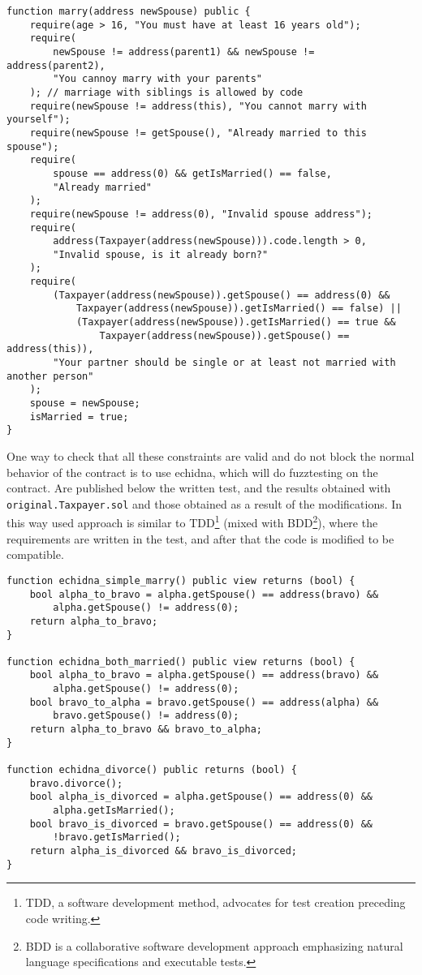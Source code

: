 \documentclass{article}
\begin{document}
\begin{verbatim}
function marry(address newSpouse) public {
    require(age > 16, "You must have at least 16 years old");
    require(
        newSpouse != address(parent1) && newSpouse != address(parent2),
        "You cannoy marry with your parents"
    ); // marriage with siblings is allowed by code
    require(newSpouse != address(this), "You cannot marry with yourself");
    require(newSpouse != getSpouse(), "Already married to this spouse");
    require(
        spouse == address(0) && getIsMarried() == false,
        "Already married"
    );
    require(newSpouse != address(0), "Invalid spouse address");
    require(
        address(Taxpayer(address(newSpouse))).code.length > 0,
        "Invalid spouse, is it already born?"
    );
    require(
        (Taxpayer(address(newSpouse)).getSpouse() == address(0) &&
            Taxpayer(address(newSpouse)).getIsMarried() == false) ||
            (Taxpayer(address(newSpouse)).getIsMarried() == true &&
                Taxpayer(address(newSpouse)).getSpouse() == address(this)),
        "Your partner should be single or at least not married with another person"
    );
    spouse = newSpouse;
    isMarried = true;
}
\end{verbatim}
One way to check that all these constraints are valid and do not block the normal behavior of the contract is to use echidna, which will do fuzztesting on the contract. Are published below the written test, and the results obtained with \texttt{original.Taxpayer.sol} and those obtained as a result of the modifications. In this way used approach is similar to TDD\footnote{TDD, a software development method, advocates for test creation preceding code writing.} (mixed with BDD\footnote{BDD is a collaborative software development approach emphasizing natural language specifications and executable tests.}), where the requirements are written in the test, and after that the code is modified to be compatible.

\begin{verbatim}
function echidna_simple_marry() public view returns (bool) {
    bool alpha_to_bravo = alpha.getSpouse() == address(bravo) &&
        alpha.getSpouse() != address(0);
    return alpha_to_bravo;
}

function echidna_both_married() public view returns (bool) {
    bool alpha_to_bravo = alpha.getSpouse() == address(bravo) &&
        alpha.getSpouse() != address(0);
    bool bravo_to_alpha = bravo.getSpouse() == address(alpha) &&
        bravo.getSpouse() != address(0);
    return alpha_to_bravo && bravo_to_alpha;
}

function echidna_divorce() public returns (bool) {
    bravo.divorce();
    bool alpha_is_divorced = alpha.getSpouse() == address(0) &&
        alpha.getIsMarried();
    bool bravo_is_divorced = bravo.getSpouse() == address(0) &&
        !bravo.getIsMarried();
    return alpha_is_divorced && bravo_is_divorced;
}
\end{verbatim} 
\end{document}
